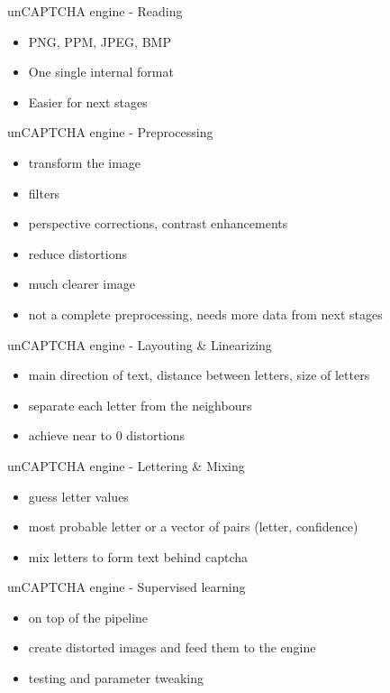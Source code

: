 \documentclass[red]{beamer}
\begin{document}
\begin{frame}{unCAPTCHA engine - Reading}
  \begin{itemize}
    \item PNG, PPM, JPEG, BMP
    \item One single internal format
    \item Easier for next stages
  \end{itemize}
\end{frame}

\begin{frame}{unCAPTCHA engine - Preprocessing}
  \begin{itemize}
    \item transform the image
    \item filters
    \item perspective corrections, contrast enhancements
    \item reduce distortions
    \item much clearer image
    \item not a complete preprocessing, needs more data from next stages
  \end{itemize}
\end{frame}

\begin{frame}{unCAPTCHA engine - Layouting \& Linearizing}
  \begin{itemize}
    \item main direction of text, distance between letters, size of letters
    \item separate each letter from the neighbours
    \item achieve near to 0 distortions
  \end{itemize}
\end{frame}

\begin{frame}{unCAPTCHA engine - Lettering \& Mixing}
  \begin{itemize}
    \item guess letter values
    \item most probable letter or a vector of pairs (letter, confidence)
    \item mix letters to form text behind captcha
  \end{itemize}
\end{frame}

\begin{frame}{unCAPTCHA engine - Supervised learning}
  \begin{itemize}
    \item on top of the pipeline
    \item create distorted images and feed them to the engine
    \item testing and parameter tweaking
  \end{itemize}
\end{frame}
\end{document}
